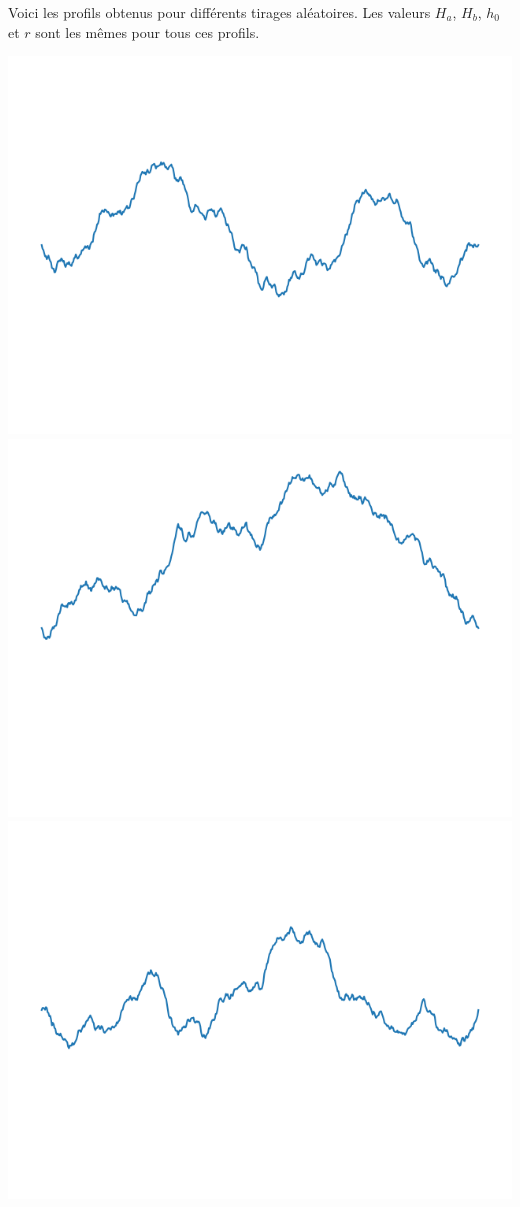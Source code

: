 \documentclass[11pt,class=report,crop=false]{standalone}
\begin{document}
\begin{exemple}
Voici les profils obtenus pour différents tirages aléatoires. Les valeurs $H_a$, $H_b$, $h_0$ et $r$ sont les mêmes pour tous ces profils.

\begin{center}
\includegraphics[scale=\myscale,scale=0.3]{figures/landscape-04-1}
\includegraphics[scale=\myscale,scale=0.3]{figures/landscape-04-6}
\includegraphics[scale=\myscale,scale=0.3]{figures/landscape-04-3}


\end{center}
\end{exemple}
\end{document}
